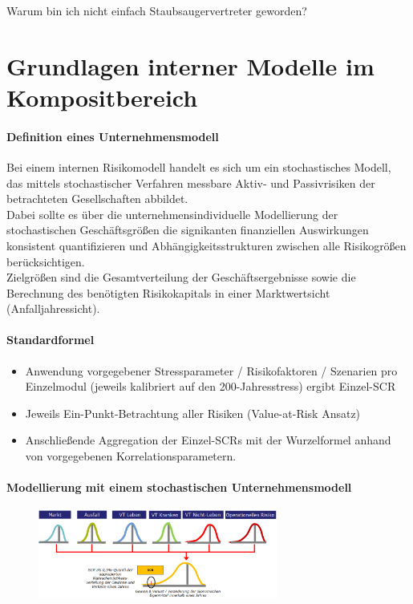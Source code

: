 \documentclass[12pt]{report}
\theoremstyle{dotless}
\theoremstyle{definition}
\begin{document}
\begin{titlepage}
	Warum bin ich nicht einfach Staubsaugervertreter geworden?
\end{titlepage}

\tableofcontents


\chapter{Grundlagen interner Modelle im Kompositbereich}

\subsubsection{Definition eines Unternehmensmodell}
Bei einem internen Risikomodell handelt es sich um ein stochastisches Modell, das mittels stochastischer Verfahren messbare Aktiv- und Passivrisiken der betrachteten Gesellschaften abbildet. \\
Dabei sollte es über die unternehmensindividuelle Modellierung der stochastischen Geschäftsgrößen die signikanten finanziellen Auswirkungen konsistent quantifizieren und Abhängigkeitsstrukturen zwischen alle Risikogrößen berücksichtigen.\\
Zielgrößen sind die Gesamtverteilung der Geschäftsergebnisse sowie die Berechnung des benötigten Risikokapitals in einer Marktwertsicht (Anfalljahressicht).

\subsubsection{Standardformel}
\begin{itemize}
\item Anwendung vorgegebener Stressparameter / Risikofaktoren / Szenarien pro Einzelmodul (jeweils kalibriert auf den 200-Jahresstress) ergibt Einzel-SCR
\item Jeweils Ein-Punkt-Betrachtung aller Risiken (Value-at-Risk Ansatz)
\item Anschließende Aggregation der Einzel-SCRs mit der Wurzelformel anhand von vorgegebenen Korrelationsparametern.
\end{itemize}

\subsubsection{Modellierung mit einem stochastischen Unternehmensmodell}

\begin{figure}[ht]
	\centering
	\includegraphics[width= 0.7\textwidth]{Bilder/StochUnternehmensmodell.png}
\end{figure}
\end{document}
